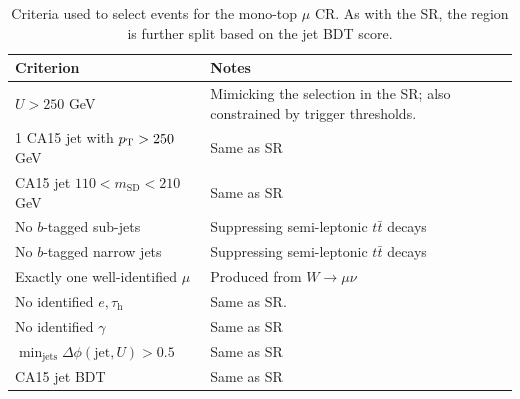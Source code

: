 \begin{table}[]
    \caption{Criteria used to select events for the mono-top $\mu$ CR. As with the SR, the region is further split based on the jet BDT score.}
    \label{tab:mt:wmn_cuts}
    \centering
    \begin{tabular}{p{}p{}}
        Criterion & Notes \\
        \hline
        \hline
        $U>250$ GeV & Mimicking the selection in the SR; also constrained by trigger thresholds. \\
        1 CA15 jet with $p_\mathrm{T}>250$ GeV &  Same as SR \\
        CA15 jet $110 < m_\mathrm{SD} < 210$ GeV & Same as SR \\
        No $b$-tagged sub-jets & Suppressing semi-leptonic $t\bar{t}$ decays \\
        No $b$-tagged narrow jets & Suppressing semi-leptonic $t\bar{t}$ decays \\
        \hline
        Exactly one well-identified $\mu$ & Produced from $W\rightarrow\mu\nu$ \\
        No identified $e,\tau_\mathrm{h}$ & Same as SR. \\
        No identified $\gamma$ & Same as SR \\
        \hline
        $\min_\mathrm{jets}\Delta\phi(\mathrm{jet},U) > 0.5$ & Same as SR \\
        \hline
        CA15 jet BDT & Same as SR\\
    \end{tabular}
\end{table}


